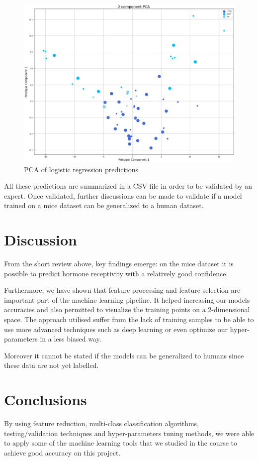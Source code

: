 \documentclass[10pt,conference,compsocconf]{IEEEtran}
\begin{document}
\begin{figure}[H]
    \centering
    \includegraphics[width=0.8\columnwidth]{figures/predicted_pca.png}
    \caption{PCA of logistic regression predictions}
    \label{fig:pred_results}
\end{figure}

All these predictions are summarized in a CSV file in order to be validated by an expert. Once validated, further discussions can be made to validate if a model trained on a mice dataset can be generalized to a human dataset.

\section{Discussion}
From the short review above, key findings emerge: on the mice dataset it is possible to predict hormone receptivity with a relatively good confidence.

Furthermore, we have shown that feature processing and feature selection are important part of the machine learning pipeline. It helped increasing our models accuracies and also permitted to visualize the training points on a 2-dimensional space. The approach utilised suffer from the lack of training samples to be able to use more advanced techniques such as deep learning or even optimize our hyper-parameters in a less biased way.

Moreover it cannot be stated if the models can be generalized to humans since these data are not yet labelled. 

\section{Conclusions}
By using feature reduction, multi-class classification algorithms, testing/validation techniques and hyper-parameters tuning methods, we were able to apply some of the machine learning tools that we studied in the course to achieve good accuracy on this project.
\end{document}
